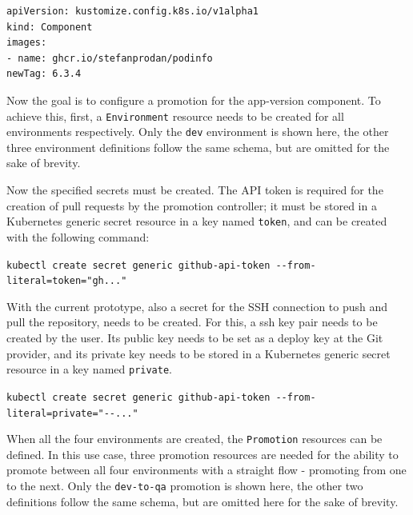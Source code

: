 \begin{lstlisting}
apiVersion: kustomize.config.k8s.io/v1alpha1
kind: Component
images:
- name: ghcr.io/stefanprodan/podinfo
newTag: 6.3.4
\end{lstlisting}

Now the goal is to configure a promotion for the app-version component.
To achieve this, 
first, a \lstinline|Environment| resource needs to be created
for all environments respectively.
Only the \lstinline|dev| environment is shown here,
the other three environment definitions follow the same schema,
but are omitted for the sake of brevity.



%
%
%
%
%

Now the specified secrets must be created.
The API token is required for the creation of pull requests by the promotion controller;
it must be stored in a Kubernetes generic secret resource in a key named \lstinline|token|,
and can be created with the following command:

\lstinline|kubectl create secret generic github-api-token --from-literal=token="gh..."|

With the current prototype, also a secret for the SSH connection to push and pull
the repository, needs to be created.
For this, a ssh key pair needs to be created by the user. Its public key needs to 
be set as a deploy key at the Git provider,
and its private key needs to be stored in a
Kubernetes generic secret resource in a key named \lstinline|private|.

\lstinline|kubectl create secret generic github-api-token --from-literal=private="--..."|

When all the four environments are created, the \lstinline|Promotion| resources
can be defined.
In this use case, three promotion resources are needed for the ability to
promote between all four environments with a straight flow - promoting from one to the next.
Only the \lstinline|dev-to-qa| promotion is shown here,
the other two definitions follow the same schema,
but are omitted here for the sake of brevity.



%
%
%





